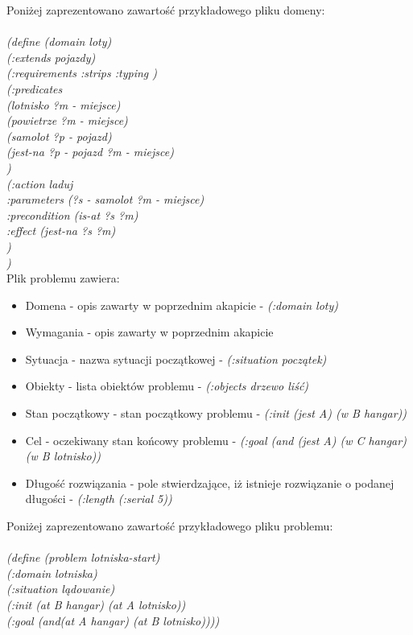 Poniżej zaprezentowano zawartość przykładowego pliku domeny:\\\\
\textit{(define (domain loty)\\
(:extends pojazdy)\\
(:requirements :strips :typing )\\
(:predicates\\	
\hspace*{1cm}(lotnisko ?m - miejsce)\\
\hspace*{1cm}(powietrze ?m - miejsce)\\
\hspace*{1cm}(samolot	?p - pojazd)\\
{  } (jest-na ?p - pojazd ?m - miejsce)\\ 
)\\
  (:action laduj\\
   :parameters (?s - samolot ?m - miejsce)\\ 
\hspace*{1cm}:precondition (is-at ?s ?m) \\
\hspace*{1cm}:effect (jest-na ?s ?m) \\
)\\
)} \\

Plik problemu zawiera:
\begin{itemize}
\item Domena - opis zawarty w poprzednim akapicie - \textit{(:domain loty)}
\item Wymagania - opis zawarty w poprzednim akapicie
\item Sytuacja - nazwa sytuacji początkowej - \textit{(:situation początek)}
\item Obiekty - lista obiektów problemu - \textit{(:objects drzewo liść)}
\item Stan początkowy - stan początkowy problemu - \textit{(:init (jest A) (w B hangar))}
\item Cel - oczekiwany stan końcowy problemu - \textit{(:goal (and (jest A) (w C hangar) (w B lotnisko))}
\item Długość rozwiązania - pole stwierdzające, iż istnieje rozwiązanie o podanej długości - \textit{(:length (:serial 5))}
\end{itemize}

Poniżej zaprezentowano zawartość przykładowego pliku problemu:\\\\
\textit{(define (problem lotniska-start)\\
\hspace*{1cm}(:domain lotniska)\\
\hspace*{1cm}(:situation lądowanie)\\
\hspace*{1cm}(:init (at B hangar) (at A lotnisko))\\
\hspace*{1cm}(:goal (and(at A hangar) (at B lotnisko))))}


